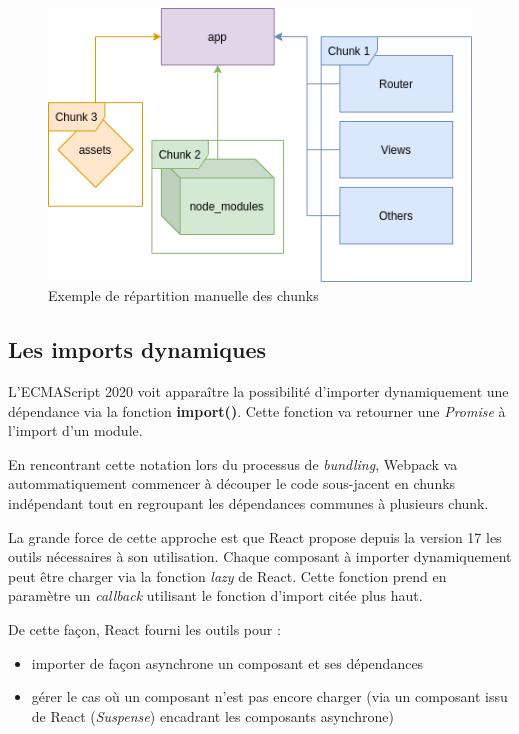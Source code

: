 \documentclass[12pt,a4paper,oneside]{scrreprt}
\begin{document}
\begin{figure}[!ht]
	\centering
	\includegraphics[width=\textwidth]{pictures/webpack_chunks.png}
	\caption{Exemple de répartition manuelle des chunks}
\end{figure}

\newpage
\subsection{Les imports dynamiques}

L'ECMAScript 2020 voit apparaître la possibilité d'importer dynamiquement une dépendance via la fonction \textbf{import()}. Cette fonction va retourner une \textit{Promise} à l'import d'un module.

En rencontrant cette notation lors du processus de \og\textit{bundling}\fg{}, Webpack va autommatiquement commencer à découper le code sous-jacent en chunks indépendant tout en regroupant les dépendances communes à plusieurs chunk.

La grande force de cette approche est que React propose depuis la version 17 les outils nécessaires à son utilisation. Chaque composant à importer dynamiquement peut être charger via la fonction \textit{lazy} de React. Cette fonction prend en paramètre un \textit{callback} utilisant le fonction d'import citée plus haut.

De cette façon, React fourni les outils pour :
\begin{itemize}
	\item importer de façon asynchrone un composant et ses dépendances
	\item gérer le cas où un composant n'est pas encore charger (via un composant issu de React (\textit{Suspense}) encadrant les composants asynchrone)
\end{itemize}
\end{document}
